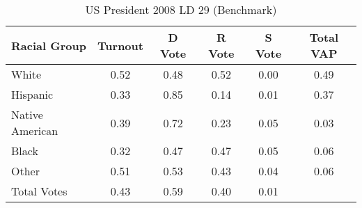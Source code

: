 \begin{table}[htb]
\begin{center}
\caption{US President 2008 LD 29 (Benchmark)}
\label{pres08_vap_ld_29_benchmark}
\begin{tabular}{lccccc}
  \hline
Racial Group & Turnout & D Vote & R Vote & S Vote & Total VAP \\ 
  \hline
White & 0.52 & 0.48 & 0.52 & 0.00 & 0.49 \\ 
  Hispanic & 0.33 & 0.85 & 0.14 & 0.01 & 0.37 \\ 
  Native American & 0.39 & 0.72 & 0.23 & 0.05 & 0.03 \\ 
  Black & 0.32 & 0.47 & 0.47 & 0.05 & 0.06 \\ 
  Other & 0.51 & 0.53 & 0.43 & 0.04 & 0.06 \\ 
  Total Votes & 0.43 & 0.59 & 0.40 & 0.01 &  \\ 
   \hline
\end{tabular}
\end{center}
\end{table}
